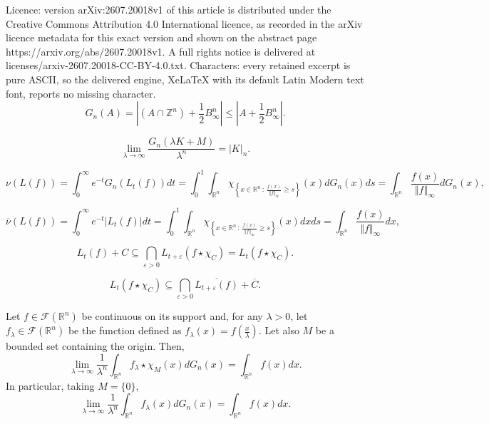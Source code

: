 \documentclass[10pt,a4paper]{amsart}
\newcommand{\R}{\mathbb R}
\newcommand{\Z}{\mathbb Z}
\begin{document}
Licence: version arXiv:2607.20018v1 of this article is distributed under the Creative Commons Attribution 4.0 International licence, as recorded in the arXiv licence metadata for this exact version and shown on the abstract page https://arxiv.org/abs/2607.20018v1. A full rights notice is delivered at licenses/arxiv-2607.20018-CC-BY-4.0.txt. Characters: every retained excerpt is pure ASCII, so the delivered engine, XeLaTeX with its default Latin Modern text font, reports no missing character.
\begin{equation}\label{eq:LatticePointAndVolume}
G_n(A)=\left|(A\cap\Z^n)+\frac{1}{2}B_\infty^n\right|\leq\left|A+\frac{1}{2}B_\infty^n\right|.
\end{equation}

\begin{equation}\label{discrete_continuous_volume}
\lim_{\lambda \to \infty} \frac{G_n(\lambda K+M)}{\lambda^n} = |K|_n.
\end{equation}

\begin{equation}\label{eq:nu(L)Integral}
\nu(L(f))=\int_0^\infty e^{-t} G_n(L_t(f))dt=\int_0^1\int_{\R^n}\chi_{\left\{x\in\R^n\,:\,\frac{f(x)}{\Vert f\Vert_\infty} \geq s \right\}}(x)dG_n(x)ds=\int_{\R^n}\frac{f(x)}{\Vert f\Vert_\infty}dG_n(x),
\end{equation}

\begin{equation}\label{eq:barnu(L)Integral}
\overline{\nu}(L(f))=\int_0^\infty e^{-t} |L_t(f)|dt=\int_0^1\int_{\R^n}\chi_{\left\{x\in\R^n\,:\,\frac{f(x)}{\Vert f\Vert_\infty}\geq s\right\}}(x)dxds=\int_{\R^n}\frac{f(x)}{\Vert f\Vert_\infty}dx,
\end{equation}

\begin{equation}\label{eq:InclusionSuperlevelSetsAsplund}
L_{t}(f)+C\subseteq \bigcap_{\varepsilon>0}L_{t+\varepsilon}(f\star \chi_C)=L_t(f\star\chi_C).
\end{equation}

\begin{equation}\label{eq:InverseInclusionSuperLevelSetsAsplund}
L_t(f\star\chi_C)\subseteq\bigcap_{\varepsilon>0}\overline{L_{t+\varepsilon}(f)}+\overline{C}.
\end{equation}

\begin{lemma}\label{lem:LogConcaveIntegralDiscreteToContinuous}
Let $f\in\mathcal{F}(\R^n)$ be continuous on its support and, for any $\lambda>0$, let  $f_\lambda\in\mathcal{F}(\R^n)$ be the function defined as $f_\lambda(x)= f\left(\frac{x}{\lambda}\right)$. Let also $M$ be a bounded set containing the origin. Then,
$$
\lim_{\lambda\to\infty}\frac{1}{\lambda^n}\int_{\R^n}f_\lambda\star\chi_{M}(x)dG_n(x)=\int_{\R^n}f(x)dx.
$$
In particular, taking $M=\{0\}$,
$$
\lim_{\lambda\to\infty}\frac{1}{\lambda^n}\int_{\R^n}f_\lambda(x)dG_n(x)=\int_{\R^n}f(x)dx.
$$
\end{lemma}
\end{document}
